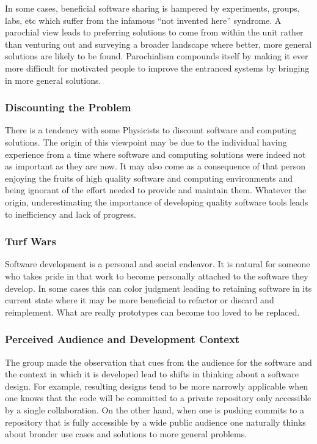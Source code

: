 In some cases, beneficial software sharing is hampered by experiments,
groups, labs, etc which suffer from the infamous ``not invented here''
syndrome.  A parochial view leads to preferring solutions to come from
within the unit rather than venturing out and surveying a broader
landscape where better, more general solutions are likely to be found.
Parochialism compounds itself by making it ever more difficult for
motivated people to improve the entranced systems by bringing in more 
general solutions.

\subsubsection{Discounting the Problem}

There is a tendency with some Physicists to discount software and
computing solutions.  The origin of this viewpoint may be due to the
individual having experience from a time where software and computing
solutions were indeed not as important as they are now.  It may also
come as a consequence of that person enjoying the fruits of high
quality software and computing environments and being ignorant of the
effort needed to provide and maintain them.  Whatever the origin,
underestimating the importance of developing quality software tools leads
to inefficiency and lack of progress. 

\subsubsection{Turf Wars}

Software development is a personal and social endeavor.  It is natural
for someone who takes pride in that work to become personally attached
to the software they develop.  In some cases this can color judgment
leading to retaining software in its current state where it may be
more beneficial to refactor or discard and reimplement.  What are
really prototypes can become too loved to be replaced.

\subsubsection{Perceived Audience and Development Context}

The group made the observation that cues from the audience for the
software and the context in which it is developed lead to shifts in
thinking about a software design.  For example, resulting designs tend to be more narrowly
applicable when one knows that the code will be committed to a private
repository only accessible by a single collaboration.  On the other hand, 
when one is pushing commits to a repository that is fully accessible
by a wide public audience one naturally thinks about broader use cases and 
solutions to more general problems.

